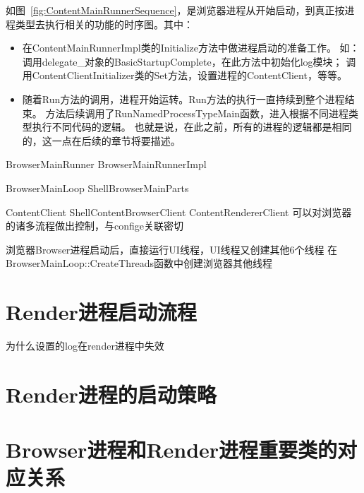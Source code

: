 如图~\ref{fig:ContentMainRunnerSequence}，是浏览器进程从开始启动，到真正按进程类型去执行相关的功能的时序图。其中：
\begin{itemize}
  \item 在ContentMainRunnerImpl类的Initialize方法中做进程启动的准备工作。
  如：调用delegate\_对象的BasicStartupComplete，在此方法中初始化log模块；
  调用ContentClientInitializer类的Set方法，设置进程的ContentClient，等等。
  \item 随着Run方法的调用，进程开始运转。Run方法的执行一直持续到整个进程结束。
  方法后续调用了RunNamedProcessTypeMain函数，进入根据不同进程类型执行不同代码的逻辑。
  也就是说，在此之前，所有的进程的逻辑都是相同的，这一点在后续的章节将要描述。
\end{itemize}





BrowserMainRunner
BrowserMainRunnerImpl

BrowserMainLoop
ShellBrowserMainParts


ContentClient
ShellContentBrowserClient
ContentRendererClient
可以对浏览器的诸多流程做出控制，与confige关联密切

浏览器Browser进程启动后，直接运行UI线程，UI线程又创建其他6个线程
在BrowserMainLoop::CreateThreads函数中创建浏览器其他线程


\section{Render进程启动流程}

为什么设置的log在render进程中失效

\section{Render进程的启动策略}

\section{Browser进程和Render进程重要类的对应关系}
